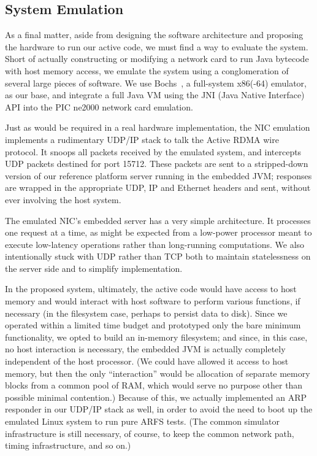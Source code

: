 \documentclass[10pt]{article}
\begin{document}
\subsection{System Emulation}

As a final matter, aside from designing the software architecture and
proposing the hardware to run our active code, we must find a way to
evaluate the system. Short of actually constructing or modifying a
network card to run Java bytecode with host memory access, we emulate
the system using a conglomeration of several large pieces of
software. We use Bochs~\cite{bochs}, a full-system x86(-64) emulator,
as our base, and integrate a full Java VM using the JNI (Java Native
Interface) API into the PIC ne2000 network card emulation.

Just as would be required in a real hardware implementation, the NIC
emulation implements a rudimentary UDP/IP stack to talk the Active
RDMA wire protocol. It snoops all packets received by the emulated
system, and intercepts UDP packets destined for port 15712. These
packets are sent to a stripped-down version of our reference platform
server running in the embedded JVM; responses are wrapped in the
appropriate UDP, IP and Ethernet headers and sent, without ever
involving the host system.

The emulated NIC's embedded server has a very simple architecture. It
processes one request at a time, as might be expected from a low-power
processor meant to execute low-latency operations rather than
long-running computations. We also intentionally stuck with UDP rather
than TCP both to maintain statelessness on the server side and to
simplify implementation.

In the proposed system, ultimately, the active code would have access
to host memory and would interact with host software to perform
various functions, if necessary (in the filesystem case, perhaps to
persist data to disk). Since we operated within a limited time budget
and prototyped only the bare minimum functionality, we opted to build
an in-memory filesystem; and since, in this case, no host interaction
is necessary, the embedded JVM is actually completely independent of
the host processor. (We could have allowed it access to host memory,
but then the only ``interaction'' would be allocation of separate
memory blocks from a common pool of RAM, which would serve no purpose
other than possible minimal contention.) Because of this, we actually
implemented an ARP responder in our UDP/IP stack as well, in order to
avoid the need to boot up the emulated Linux system to run pure ARFS
tests. (The common simulator infrastructure is still necessary, of
course, to keep the common network path, timing infrastructure, and so
on.)
\end{document}
